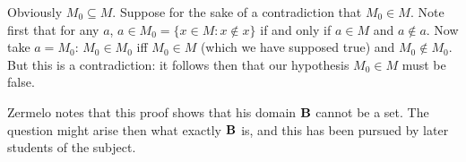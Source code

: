 \documentclass[12pt]{article}
\begin{document}
\begin{enumerate}
\begin{description}
Obviously $M_0 \subseteq M$.  Suppose for the sake of a contradiction that $M_0 \in M$.  Note first that for any $a$, $a \in M_0 = \{x \in M:x \not\in x\}$ if and only if $a \in M$ and $a \not\in a$.  Now take $a=M_0$:  $M_0 \in M_0$ iff $M_0 \in M$ (which we have supposed true) and $M_0 \not\in M_0$.  But this is a contradiction:  it follows then that our hypothesis $M_0 \in M$ must be false.

\end{description}

Zermelo notes that this proof shows that his domain $\bf B$ cannot be a set.  The question might arise then what exactly $\bf B$ is, and this has been pursued by later students of the subject.

\end{enumerate}
\end{document}
